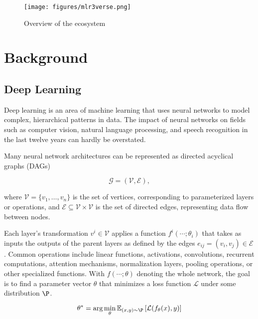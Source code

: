 \documentclass[article, nojss]{jss}
\theoremstyle{definition}
\begin{document}
\begin{figure}
    \centering
    \texttt{[image: figures/mlr3verse.png]}
    \caption{Overview of the \mlrt{} ecosystem}
    \label{fig:mlr3-ecosystem}
\end{figure}

\section{Background}\label{sec:background}


\subsection{Deep Learning}\label{sec:background_dl}

Deep learning is an area of machine learning that uses neural networks to model complex, hierarchical patterns in data.
The impact of neural networks on fields such as computer vision, natural language processing, and speech recognition in the last twelve years can hardly be overstated.

Many neural network architectures can be represented as directed acyclical graphs (DAGs)

\begin{equation}
    \mathcal{G} = (\mathcal{V}, \mathcal{E}),
\end{equation}

where $\mathcal{V} = \{v_1, \ldots, v_n\}$ is the set of vertices, corresponding to parameterized layers or operations, and $\mathcal{E} \subseteq \mathcal{V} \times \mathcal{V}$ is the set of directed edges, representing data flow between nodes.

Each layer's transformation $v^i \in \mathcal{V}$ applies a function $f^i(\cdots; \theta_i)$ that takes as inputs the outputs of the parent layers as defined by the edges $e_{ij} = (v_i, v_j) \in \mathcal{E}$.
Common operations include linear functions, activations, convolutions, recurrent computations, attention mechanisms, normalization layers, pooling operations, or other specialized functions.
With $f(\cdots; \theta)$ denoting the whole network, the goal is to find a parameter vector $\theta$ that minimizes a loss function $\mathcal{L}$ under some distribution $\P$.

\begin{equation}
\theta^* = \arg \min_{\theta} \mathbb{E}_{(x, y) \sim \P} \left[ \mathcal{L}(f_{\theta}(x), y) \right]
\end{equation}
\end{document}
